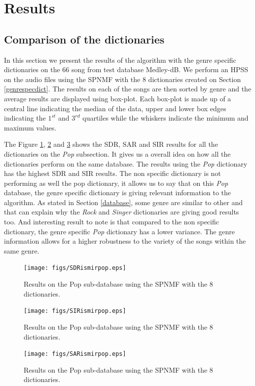 \documentclass{article}
\begin{document}
\section{Results}


\subsection{Comparison of the dictionaries}

In this section we present the results of the algorithm with the genre specific dictionaries on the $66$ song from test database Medley-dB. We perform an HPSS on the audio files using the SPNMF with the $8$ dictionaries created on Section \ref{genrespecdict}. The results on each of the songs are then sorted by genre and the average results are displayed using box-plot. Each box-plot is made up of a central line indicating the median of the data, upper and lower box edges indicating the $1^{st}$ and $3^{rd}$ quartiles while the whiskers indicate the minimum and maximum values. 

The Figure \ref{sdrpop}, \ref{sirpop} and \ref{sarpop} shows the SDR, SAR and SIR results for all the dictionaries on the \emph{Pop} subsection. It gives us a overall idea on how all the dictionaries perform on the same database. The results using the \emph{Pop} dictionary has the highest SDR and SIR results. The non specific dictionary is not performing as well the pop dictionary, it allows us to say that on this \emph{Pop} database, the genre specific dictionary is giving relevant information to the algorithm. As stated in Section \ref{database}, some genre are similar to other and that can explain why the \emph{Rock} and \emph{Singer} dictionaries are giving good results too. 
And interesting result to note is that compared to the non specific dictionary, the genre specific \emph{Pop} dictionary has a lower variance. The genre information allows for a higher robustness to the variety of the songs within the same genre.  

\begin{figure}[h]

  \centering 
  \texttt{[image: figs/SDRismirpop.eps]}
  \caption{\label{sdrpop} Results on the Pop sub-database using the SPNMF with the 8 dictionaries.}
  
\end{figure}\begin{figure}[h]

  \centering 
  \texttt{[image: figs/SIRismirpop.eps]}
  \caption{\label{sirpop} Results on the Pop sub-database using the SPNMF with the 8 dictionaries.}
  
\end{figure}\begin{figure}[h]

  \centering 
  \texttt{[image: figs/SARismirpop.eps]}
  \caption{\label{sarpop} Results on the Pop sub-database using the SPNMF with the 8 dictionaries.}
  
\end{figure}
\end{document}
